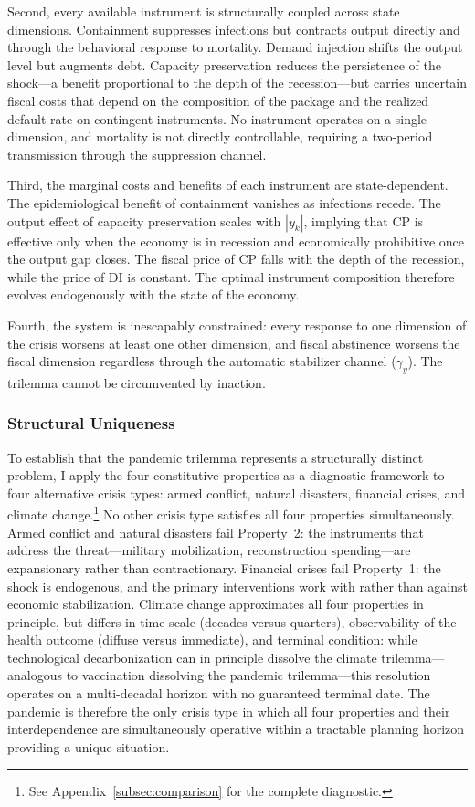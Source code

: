 \documentclass[12pt, a4paper]{article}
\begin{document}
Second, every available instrument is structurally coupled across state dimensions. Containment suppresses infections but contracts output directly and through the behavioral response to mortality. Demand injection shifts the output level but augments debt. Capacity preservation reduces the persistence of the shock---a benefit proportional to the depth of the recession---but carries uncertain fiscal costs that depend on the composition of the package and the realized default rate on contingent instruments. No instrument operates on a single dimension, and mortality is not directly controllable, requiring a two-period transmission through the suppression channel.

Third, the marginal costs and benefits of each instrument are state-dependent. The epidemiological benefit of containment vanishes as infections recede. The output effect of capacity preservation scales with $|y_k|$, implying that CP is effective only when the economy is in recession and economically prohibitive once the output gap closes. The fiscal price of CP falls with the depth of the recession, while the price of DI is constant. The optimal instrument composition therefore evolves endogenously with the state of the economy.

Fourth, the system is inescapably constrained: every response to one dimension of the crisis worsens at least one other dimension, and fiscal abstinence worsens the fiscal dimension regardless through the automatic stabilizer channel ($\gamma_y$). The trilemma cannot be circumvented by inaction.

\subsubsection{Structural Uniqueness}

To establish that the pandemic trilemma represents a structurally distinct problem, I apply the four constitutive properties as a diagnostic framework to four alternative crisis types: armed conflict, natural disasters, financial crises, and climate change.\footnote{See Appendix~\ref{subsec:comparison} for the complete diagnostic.} No other crisis type satisfies all four properties simultaneously. Armed conflict and natural disasters fail Property~2: the instruments that address the threat---military mobilization, reconstruction spending---are expansionary rather than contractionary. Financial crises fail Property~1: the shock is endogenous, and the primary interventions work with rather than against economic stabilization. Climate change approximates all four properties in principle, but differs in time scale (decades versus quarters), observability of the health outcome (diffuse versus immediate), and terminal condition: while technological decarbonization can in principle dissolve the climate trilemma---analogous to vaccination dissolving the pandemic trilemma---this resolution operates on a multi-decadal horizon with no guaranteed terminal date. The pandemic is therefore the only crisis type in which all four properties and their interdependence are simultaneously operative within a tractable planning horizon providing a unique situation.
\end{document}
